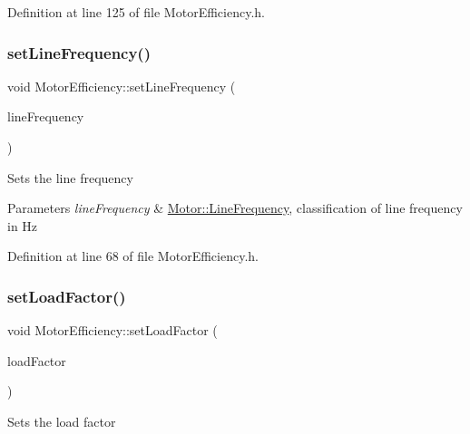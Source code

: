 Definition at line 125 of file Motor\+Efficiency.\+h.

\mbox{\label{class_motor_efficiency_a993b09941d330d3a46e0d72bd6dc65bb}} 
\subsubsection{\texorpdfstring{set\+Line\+Frequency()}{setLineFrequency()}}
{\footnotesize\ttfamily void Motor\+Efficiency\+::set\+Line\+Frequency (\begin{DoxyParamCaption}\item[{\hyperlink{class_motor_acee1bdf1b684ad36cb80dc2829d9fcee}{Motor\+::\+Line\+Frequency}}]{line\+Frequency }\end{DoxyParamCaption})\hspace{0.3cm}{\ttfamily [inline]}}

Sets the line frequency


\begin{DoxyParams}{Parameters}
{\em line\+Frequency} & \hyperlink{class_motor_acee1bdf1b684ad36cb80dc2829d9fcee}{Motor\+::\+Line\+Frequency}, classification of line frequency in Hz \\
\hline
\end{DoxyParams}


Definition at line 68 of file Motor\+Efficiency.\+h.

\mbox{\label{class_motor_efficiency_ad6a7b0eb436378f36ceb8a0cec121786}} 
\subsubsection{\texorpdfstring{set\+Load\+Factor()}{setLoadFactor()}}
{\footnotesize\ttfamily void Motor\+Efficiency\+::set\+Load\+Factor (\begin{DoxyParamCaption}\item[{double}]{load\+Factor }\end{DoxyParamCaption})\hspace{0.3cm}{\ttfamily [inline]}}

Sets the load factor


